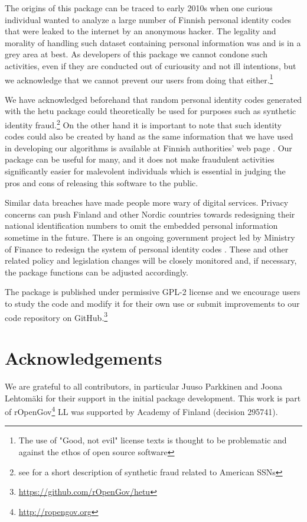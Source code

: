 The origins of this package can be traced to early 2010s when one curious individual wanted to analyze a large number of Finnish personal identity codes that were leaked to the internet by an anonymous hacker. The legality and morality of handling such dataset containing personal information was and is in a grey area at best. As developers of this package we cannot condone such activities, even if they are conducted out of curiousity and not ill intentions, but we acknowledge that we cannot prevent our users from doing that either.\footnote{The use of "Good, not evil" license texts is thought to be problematic and against the ethos of open source software} 

We have acknowledged beforehand that random personal identity codes generated with the hetu package could theoretically be used for purposes such as synthetic identity fraud.\footnote{see \citet[32]{brensinger2021} for a short description of synthetic fraud related to American SSNs} On the other hand it is important to note that such identity codes could also be created by hand as the same information that we have used in developing our algorithms is available at Finnish authorities' web page \citep{hetudvv}. Our package can be useful for many, and it does not make fraudulent activities significantly easier for malevolent individuals which is essential in judging the pros and cons of releasing this software to the public.

Similar data breaches have made people more wary of digital services. Privacy concerns can push Finland and other Nordic countries towards redesigning their national identification numbers to omit the embedded personal information sometime in the future. There is an ongoing government project led by Ministry of Finance to redesign the system of personal identity codes \citep{hetuvm}. These and other related policy and legislation changes will be closely monitored and, if necessary, the package functions can be adjusted accordingly.

The package is published under permissive GPL-2 license and we encourage users to study the code and modify it for their own use or submit improvements to our code repository on GitHub.\footnote{\url{https://github.com/rOpenGov/hetu}}

\section{Acknowledgements}

We are grateful to all contributors, in particular Juuso Parkkinen and Joona Lehtomäki for their support in the initial package development. This work is part of rOpenGov\footnote{\url{http://ropengov.org}} LL was supported by Academy of Finland (decision 295741).



\address{Pyry Kantanen\\
  Department of Computing\\
  PO Box 20014 University of Turku\\
  Finland\\}

\address{Leo Lahti\\
  Department of Computing\\
  PO Box 20014 University of Turku\\
  Finland\\}
